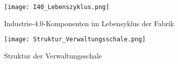 \begin{figure}[h]
  \centering
  \texttt{[image: I40\_Lebenszyklus.png]}
  \caption[Industrie-4.0-Komponenten im Lebensyklus der Fabrik]{Industrie-4.0-Komponenten im Lebensyklus der Fabrik \citep[S. 56]{BITKOM2015}}
  \label{lifecycle}
\end{figure}

\begin{figure}[h]
  \centering
  \texttt{[image: Struktur\_Verwaltungsschale.png]}
  \caption[Struktur der Verwaltungsschale]{Struktur der Verwaltungsschale}
  \label{verwaltungsschale}
\end{figure}

\newpage


